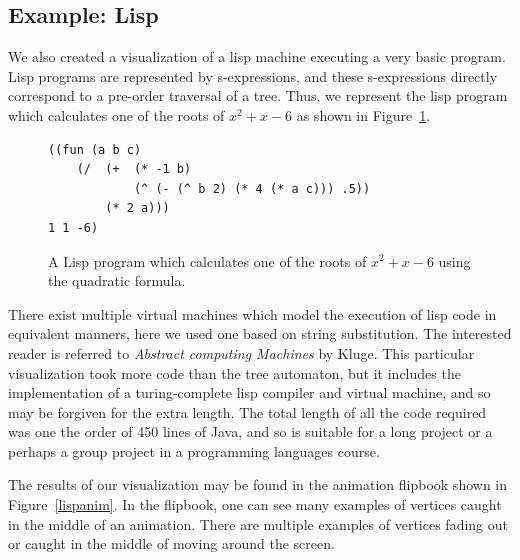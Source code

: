\documentclass{article}
\begin{document}
\subsection{Example: Lisp}

We also created a visualization of a lisp machine executing a very basic program.  Lisp programs are represented by s-expressions, and these s-expressions directly correspond to a pre-order traversal of a tree.  Thus, we represent the lisp program which calculates one of the roots of $x^2+x-6$ as shown in Figure~\ref{lispprog}.
\begin{figure}
\begin{verbatim}((fun (a b c) 
    (/  (+  (* -1 b) 
            (^ (- (^ b 2) (* 4 (* a c))) .5)) 
        (* 2 a)))  
1 1 -6)
\end{verbatim}
\caption{A Lisp program which calculates one of the roots of $x^2+x-6$ using the quadratic formula.}
\label{lispprog}
\end{figure}

There exist multiple virtual machines which model the execution of lisp code in equivalent manners, here we used one based on string substitution.  The interested reader is referred to {\it Abstract computing Machines} by Kluge\cite{acm}.  This particular visualization took more code than the tree automaton, but it includes the implementation of a turing-complete lisp compiler and virtual machine, and so may be forgiven for the extra length.  The total length of all the code required was one the order of 450 lines of Java, and so is suitable for a long project or a perhaps a group project in a programming languages course.

The results of our visualization may be found in the animation flipbook shown
in Figure~\ref{lispanim}. In the flipbook, one can see many examples of
vertices caught in the middle of an animation.  There are multiple examples of
vertices fading out or caught in the middle of moving around the screen.
\end{document}
